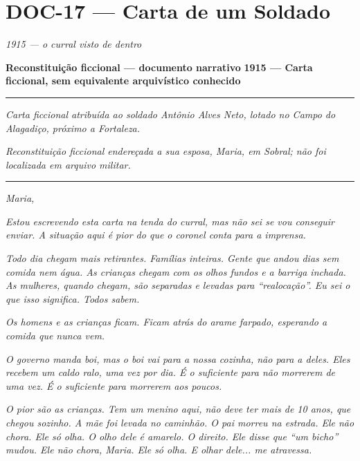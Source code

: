 \section*{\textbf{DOC-17} --- Carta de um Soldado}

\noindent \textit{1915 --- o curral visto de dentro}

\noindent \textbf{Reconstituição ficcional --- documento narrativo}
\textbf{1915 --- Carta ficcional, sem equivalente arquivístico conhecido}

\vspace{0.5em}\noindent\rule{\textwidth}{0.5pt}\vspace{0.5em}

\noindent \textit{Carta ficcional atribuída ao soldado Antônio Alves Neto, lotado no Campo do Alagadiço, próximo a Fortaleza.}

\noindent \textit{Reconstituição ficcional endereçada a sua esposa, Maria, em Sobral; não foi localizada em arquivo militar.}

\vspace{0.5em}\noindent\rule{\textwidth}{0.5pt}\vspace{0.5em}

\noindent \textit{Maria,}

\noindent \textit{Estou escrevendo esta carta na tenda do curral, mas não sei se vou conseguir enviar. A situação aqui é pior do que o coronel conta para a imprensa.}

\noindent \textit{Todo dia chegam mais retirantes. Famílias inteiras. Gente que andou dias sem comida nem água. As crianças chegam com os olhos fundos e a barriga inchada. As mulheres, quando chegam, são separadas e levadas para \textquotedblleft{}realocação\textquotedblright{}. Eu sei o que isso significa. Todos sabem.}

\noindent \textit{Os homens e as crianças ficam. Ficam atrás do arame farpado, esperando a comida que nunca vem.}

\noindent \textit{O governo manda boi, mas o boi vai para a nossa cozinha, não para a deles. Eles recebem um caldo ralo, uma vez por dia. É o suficiente para não morrerem de uma vez. É o suficiente para morrerem aos poucos.}

\noindent \textit{O pior são as crianças. Tem um menino aqui, não deve ter mais de 10 anos, que chegou sozinho. A mãe foi levada no caminhão. O pai morreu na estrada. Ele não chora. Ele só olha. O olho dele é amarelo. O direito. Ele disse que \textquotedblleft{}um bicho\textquotedblright{} mudou. Ele não chora, Maria. Ele só olha. E olhar dele... me atravessa.}


